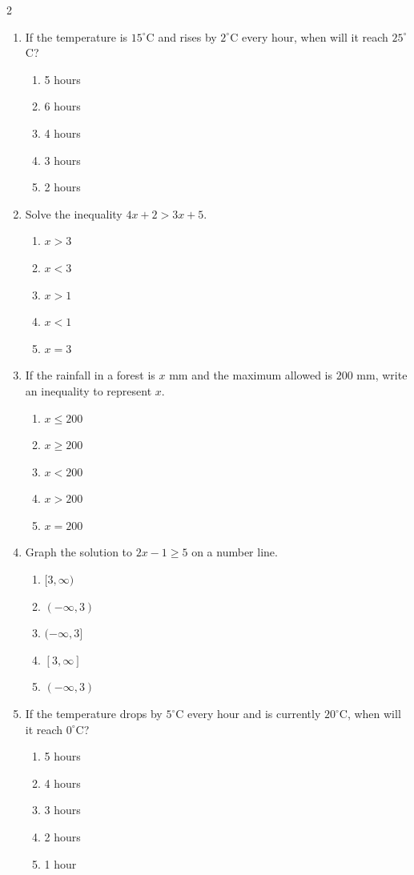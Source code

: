 \documentclass[10pt]{article}
\begin{document}
\begin{multicols}{2}
\begin{enumerate}[label=\textbf{Q\arabic*.}, leftmargin=*, itemsep=6pt, parsep=0pt]
  \item \small If the temperature is $15^\circ$C and rises by $2^\circ$C every hour, when will it reach $25^\circ$C?
  \begin{enumerate}[label=(\Alph*), leftmargin=0.6cm, nosep, itemsep=2pt]
    \item 5 hours
    \item 6 hours
    \item 4 hours
    \item 3 hours
    \item 2 hours
  \end{enumerate}

  \item \small Solve the inequality $4x + 2 > 3x + 5$.
  \begin{enumerate}[label=(\Alph*), leftmargin=0.6cm, nosep, itemsep=2pt]
    \item $x > 3$
    \item $x < 3$
    \item $x > 1$
    \item $x < 1$
    \item $x = 3$
  \end{enumerate}

  \item \small If the rainfall in a forest is $x$ mm and the maximum allowed is $200$ mm, write an inequality to represent $x$.
  \begin{enumerate}[label=(\Alph*), leftmargin=0.6cm, nosep, itemsep=2pt]
    \item $x \leq 200$
    \item $x \geq 200$
    \item $x < 200$
    \item $x > 200$
    \item $x = 200$
  \end{enumerate}

  \item \small Graph the solution to $2x - 1 \geq 5$ on a number line.
  \begin{enumerate}[label=(\Alph*), leftmargin=0.6cm, nosep, itemsep=2pt]
    \item $[3, \infty)$
    \item $(-\infty, 3)$
    \item $(-\infty, 3]$
    \item $[3, \infty]$
    \item $(-\infty, 3)$
  \end{enumerate}

  \item \small If the temperature drops by $5^\circ$C every hour and is currently $20^\circ$C, when will it reach $0^\circ$C?
  \begin{enumerate}[label=(\Alph*), leftmargin=0.6cm, nosep, itemsep=2pt]
    \item 5 hours
    \item 4 hours
    \item 3 hours
    \item 2 hours
    \item 1 hour
  \end{enumerate}


\end{enumerate}
\end{multicols}
\end{document}
